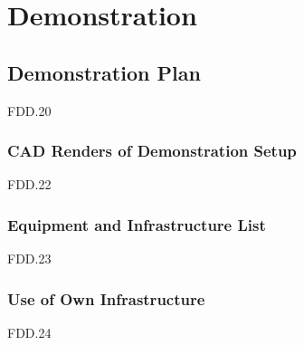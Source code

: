 \chapter{Demonstration}

\section{Demonstration Plan}
FDD.20 

\subsection{CAD Renders of Demonstration Setup}
FDD.22 

\subsection{Equipment and Infrastructure List}
FDD.23 

\subsection{Use of Own Infrastructure}
FDD.24 
